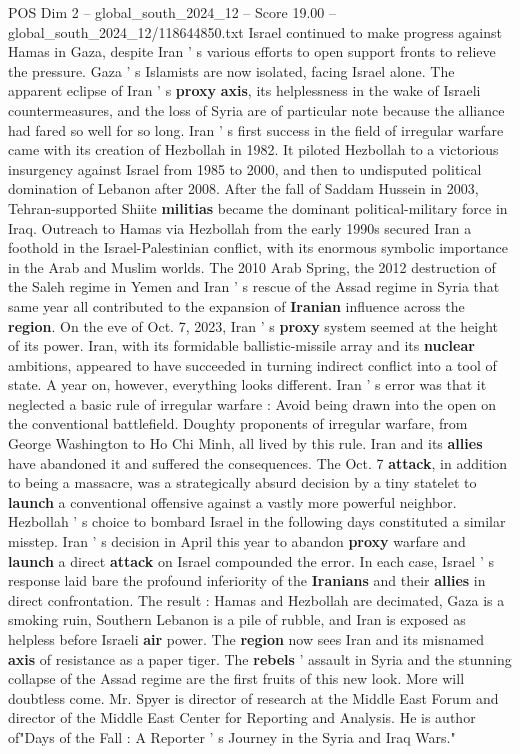 \begin{textsample}{POS Dim 2 – global\_south\_2024\_12 – Score 19.00 – global\_south\_2024\_12/118644850.txt}
Israel continued to make progress against Hamas in Gaza, despite Iran ' s various efforts to open support fronts to relieve the pressure.
Gaza ' s Islamists are now isolated, facing Israel alone.
The apparent eclipse of Iran ' s \textbf{proxy} \textbf{axis}, its helplessness in the wake of Israeli countermeasures, and the loss of Syria are of particular note because the alliance had fared so well for so long.
Iran ' s first success in the field of irregular warfare came with its creation of Hezbollah in 1982.
It piloted Hezbollah to a victorious insurgency against Israel from 1985 to 2000, and then to undisputed political domination of Lebanon after 2008.
After the fall of Saddam Hussein in 2003, Tehran-supported Shiite \textbf{militias} became the dominant political-military force in Iraq.
Outreach to Hamas via Hezbollah from the early 1990s secured Iran a foothold in the Israel-Palestinian conflict, with its enormous symbolic importance in the Arab and Muslim worlds.
The 2010 Arab Spring, the 2012 destruction of the Saleh regime in Yemen and Iran ' s rescue of the Assad regime in Syria that same year all contributed to the expansion of \textbf{Iranian} influence across the \textbf{region}.
On the eve of Oct. 7, 2023, Iran ' s \textbf{proxy} system seemed at the height of its power.
Iran, with its formidable ballistic-missile array and its \textbf{nuclear} ambitions, appeared to have succeeded in turning indirect conflict into a tool of state.
A year on, however, everything looks different.
Iran ' s error was that it neglected a basic rule of irregular warfare : Avoid being drawn into the open on the conventional battlefield.
Doughty proponents of irregular warfare, from George Washington to Ho Chi Minh, all lived by this rule.
Iran and its \textbf{allies} have abandoned it and suffered the consequences.
The Oct. 7 \textbf{attack}, in addition to being a massacre, was a strategically absurd decision by a tiny statelet to \textbf{launch} a conventional offensive against a vastly more powerful neighbor.
Hezbollah ' s choice to bombard Israel in the following days constituted a similar misstep.
Iran ' s decision in April this year to abandon \textbf{proxy} warfare and \textbf{launch} a direct \textbf{attack} on Israel compounded the error.
In each case, Israel ' s response laid bare the profound inferiority of the \textbf{Iranians} and their \textbf{allies} in direct confrontation.
The result : Hamas and Hezbollah are decimated, Gaza is a smoking ruin, Southern Lebanon is a pile of rubble, and Iran is exposed as helpless before Israeli \textbf{air} power.
The \textbf{region} now sees Iran and its misnamed \textbf{axis} of resistance as a paper tiger.
The \textbf{rebels} ' assault in Syria and the stunning collapse of the Assad regime are the first fruits of this new look.
More will doubtless come.
Mr.
Spyer is director of research at the Middle East Forum and director of the Middle East Center for Reporting and Analysis.
He is author of"Days of the Fall : A Reporter ' s Journey in the Syria and Iraq Wars."

\end{textsample}
